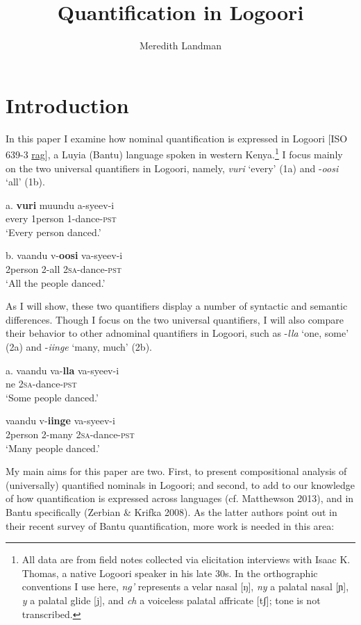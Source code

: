\documentclass[output=paper]{langsci/langscibook}
\title{Quantification in Logoori}
\author{%
 Meredith Landman \affiliation{Pomona College} 
}
\begin{document}
 
 

\section{Introduction}

In this paper I examine how nominal quantification is expressed in Logoori [ISO 639-3 \href{http://www-01.sil.org/iso639-3/documentation.asp?id=rag}{rag}], a Luyia (Bantu) language spoken in western Kenya.\footnote{ All data are from field notes collected via elicitation interviews with Isaac K. Thomas, a native Logoori speaker in his late 30s. In the orthographic conventions I use here, \textit{ng'} represents a velar nasal [ŋ], \textit{ny} a palatal nasal [ɲ], \textit{y} a palatal glide [j], and \textit{ch} a voiceless palatal affricate [tʃ]; tone is not transcribed.
} I focus mainly on the two universal quantifiers in Logoori, namely, \textit{vuri} ‘every’ (1a) and -\textit{oosi} ‘all’ (1b).

\ea
\gll \textup{a.}  \textbf{vuri}  muundu  a-syeev-i\\
     every  1person  1-dance-\textsc{pst}\\
\glt ‘Every person danced.’
\z

\ea
\gll \textup{b.}   vaandu  v-\textbf{oosi}    va-syeev-i\\
     2person  2-all    2\textsc{sa}{}-dance-\textsc{pst}\\
\glt ‘All the people danced.’
\z

As I will show, these two quantifiers display a number of syntactic and semantic differences. Though I focus on the two universal quantifiers, I will also compare their behavior to other adnominal quantifiers in Logoori, such as -\textit{lla} ‘one, some’ (2a) and -\textit{iinge} ‘many, much’ (2b).


\ea
\gll \textup{   a.}   vaandu  va-\textbf{lla}    va-syeev-i\\
ne    2\textsc{sa}{}-dance-\textsc{pst}\\
\glt ‘Some people danced.’
\z

\ea
 \gll vaandu  v-\textbf{iinge}  va-syeev-i\\
     2person  2-many  2\textsc{sa}{}-dance-\textsc{pst}\\
\glt ‘Many people danced.’\\
\z

  My main aims for this paper are two. First, to present compositional analysis of (universally) quantified nominals in Logoori; and second, to add to our knowledge of how quantification is expressed across languages (cf. Matthewson 2013), and in Bantu specifically (Zerbian \& Krifka 2008). As the latter authors point out in their recent survey of Bantu quantification, more work is needed in this area:
\end{document}
